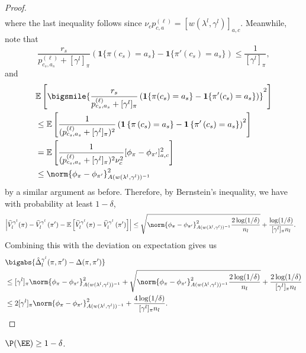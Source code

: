 \documentclass{article}
\newcommand{\1}{\mathbf{1}}
\begin{document}
\begin{proof}
\begin{align*}
\end{align*}
where the last inequality follows since $\nu_cp^{(\ell)}_{c,a}=[w(\lambda^{l},\gamma^l)]_{a,c}$. 
Meanwhile, note that $$\frac{r_s}{p^{(\ell)}_{c_s,a_s}+[\gamma^l]_\pi}\left(\1\{\pi(c_s)=a_s\}-\1\{\pi'(c_s)=a_s\}\right)\leq \frac{1}{[\gamma^l]_\pi},$$ and 
\begin{align*}
&\mathbb{E}\left[\bigsmile{\frac{r_s}{p^{(\ell)}_{c_s,a_s}+[\gamma^l]_\pi}\left(\1\{\pi(c_s)=a_s\}-\1\{\pi'(c_s)=a_s\}\right)}^{2}\right] \\
&\leq \mathbb{E}\left[\frac{1}{(p^{(\ell)}_{c_s,a_s}+[\gamma^l]_\pi)^2}\left(\mathbf{1}\left\{\pi\left(c_{s}\right)= a_{s}\right\}-\mathbf{1}\left\{\pi^{\prime}\left(c_s\right)= a_s\right\}\right)^{2}\right]\\
&= \mathbb{E}\left[\frac{1}{(p^{(\ell)}_{c_s,a_s}+[\gamma^l]_\pi)^2\nu_c^2} [\phi_\pi-\phi_{\pi'}]_{a,c}^2\right] \\
& \leq \norm{\phi_\pi-\phi_{\pi'}}_{A(w(\lambda^{l},\gamma^l))^{-1}}^2
\end{align*}
by a similar argument as before. Therefore, by Bernstein's inequality, we have with probability at least $1-\delta$, 
\begin{align*}
\left|\widehat{V}_l^{\gamma^l}(\pi)-\widehat{V}_l^{\gamma^l}\left(\pi^{\prime}\right)-\mathbb{E}\left[\widehat{V}_l^{\gamma^l}(\pi)-\widehat{V}_l^{\gamma^l}\left(\pi^{\prime}\right)\right]\right| &\leq \sqrt{\norm{\phi_\pi-\phi_{\pi'}}_{A(w(\lambda^{l},\gamma^l))^{-1}}^2 \frac{2 \log (1 / \delta)}{n_l}}+\frac{\log (1 / \delta)}{[\gamma^l]_\pi n_l}.
\end{align*}
Combining this with the deviation on expectation gives us 
\begin{align*}
    &\bigabs{\hat{\Delta}_{l}^{\gamma^l}(\pi,\pi')-\Delta(\pi,\pi')}\\
    &\leq[\gamma^l]_\pi \norm{\phi_\pi-\phi_{\pi'}}_{A(w(\lambda^{l},\gamma^l))^{-1}}^2+\sqrt{\norm{\phi_\pi-\phi_{\pi'}}_{A(w(\lambda^{l},\gamma^l))^{-1}}^2 \frac{2 \log (1 / \delta)}{n_l}}+\frac{2\log (1 / \delta)}{[\gamma^l]_\pi n_l}\\
    &\leq2[\gamma^l]_\pi \norm{\phi_\pi-\phi_{\pi'}}_{A(w(\lambda^{l},\gamma^l))^{-1}}^2+\frac{4\log (1 / \delta)}{[\gamma^l]_\pi n_l}.
\end{align*}
\end{proof}

\begin{lemma}\label{lem:good_events}
$\P(\EE)\geq 1-\delta$. 
\end{lemma}
\end{document}
